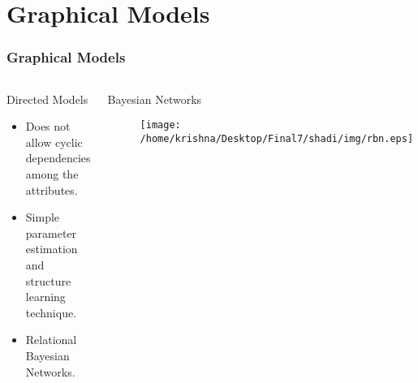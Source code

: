 \documentclass[10pt, blue,subsection=true, compress]{beamer}
\begin{document}
\section{Graphical Models}
\begin{frame} \frametitle{Graphical Models}
\begin{columns}[t]
\begin{flushleft}
\begin{block}{Directed Models}
\begin{itemize}
\item Does not allow cyclic dependencies among the attributes.
\item Simple parameter estimation and structure learning technique.
\item Relational Bayesian Networks. 
\end{itemize}
\end{block}
\end{flushleft}
\begin{block}{Bayesian Networks}
\begin{figure}[htbp]
\centering
\texttt{[image: /home/krishna/Desktop/Final7/shadi/img/rbn.eps]}
\end{figure}
\end{block}
\end{columns}
\end{frame} 
\end{document}
